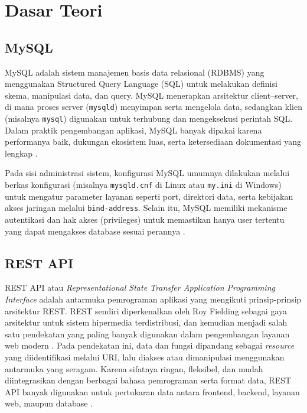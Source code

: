 \documentclass[a4paper,oneside,11pt]{book}
\begin{document}
\section{Dasar Teori}
\subsection{MySQL}

\par MySQL adalah sistem manajemen basis data relasional (RDBMS) yang menggunakan Structured Query Language (SQL) untuk melakukan definisi skema, manipulasi data, dan query. MySQL menerapkan arsitektur client--server, di mana proses server (\texttt{mysqld}) menyimpan serta mengelola data, sedangkan klien (misalnya \texttt{mysql}) digunakan untuk terhubung dan mengeksekusi perintah SQL. Dalam praktik pengembangan aplikasi, MySQL banyak dipakai karena performanya baik, dukungan ekosistem luas, serta ketersediaan dokumentasi yang lengkap \cite{mysql-refman}.

\par Pada sisi administrasi sistem, konfigurasi MySQL umumnya dilakukan melalui berkas konfigurasi (misalnya \texttt{mysqld.cnf} di Linux atau \texttt{my.ini} di Windows) untuk mengatur parameter layanan seperti port, direktori data, serta kebijakan akses jaringan melalui \texttt{bind-address}. Selain itu, MySQL memiliki mekanisme autentikasi dan hak akses (privileges) untuk memastikan hanya user tertentu yang dapat mengakses database sesuai perannya \cite{mysql-refman}.

\subsection{REST API}
\par REST API atau \textit{Representational State Transfer Application Programming Interface} adalah antarmuka pemrograman aplikasi yang mengikuti prinsip-prinsip arsitektur REST. REST sendiri diperkenalkan oleh Roy Fielding sebagai gaya arsitektur untuk sistem hipermedia terdistribusi, dan kemudian menjadi salah satu pendekatan yang paling banyak digunakan dalam pengembangan layanan web modern \cite{ibm-rest-api,restfulapi-rest}. Pada pendekatan ini, data dan fungsi dipandang sebagai \textit{resource} yang diidentifikasi melalui URI, lalu diakses atau dimanipulasi menggunakan antarmuka yang seragam. Karena sifatnya ringan, fleksibel, dan mudah diintegrasikan dengan berbagai bahasa pemrograman serta format data, REST API banyak digunakan untuk pertukaran data antara frontend, backend, layanan web, maupun database \cite{ibm-rest-api}.
\end{document}
